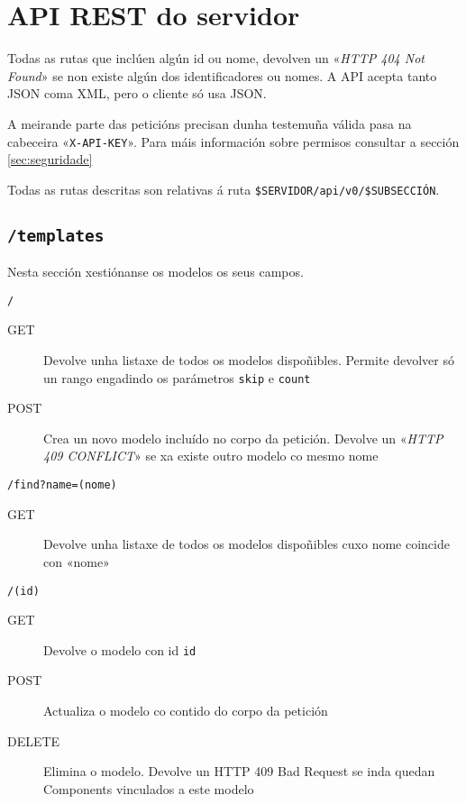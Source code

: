 \section{API REST do servidor}

Todas as rutas que inclúen algún id ou nome, devolven un «\textit{HTTP 404 Not Found}» se non existe algún dos identificadores ou nomes. A API acepta tanto JSON coma XML, pero o cliente só usa JSON.

A meirande parte das peticións precisan dunha testemuña válida pasa na cabeceira «\texttt{X-API-KEY}». Para máis información sobre permisos consultar a sección 
\ref{sec:seguridade}

Todas as rutas descritas son relativas á ruta \texttt{\$SERVIDOR/api/v0/\$SUBSECCIÓN}.

\newpage

\subsection{\texttt{/templates}}

Nesta sección xestiónanse os modelos os seus campos.

\texttt{/}

\begin{description}
    \item[GET] Devolve unha listaxe de todos os modelos dispoñibles. Permite devolver só un rango engadindo os parámetros \texttt{skip} e \texttt{count}
    \item[POST] Crea un novo modelo incluído no corpo da petición. Devolve un «\textit{HTTP 409 CONFLICT}» se xa existe outro modelo co mesmo nome
\end{description}

\texttt{/find?name=(nome)}

\begin{description}
    \item[GET] Devolve unha listaxe de todos os modelos dispoñibles cuxo nome coincide con «nome»
\end{description}

\texttt{/(id)}

\begin{description}
    \item[GET] Devolve o modelo con id \texttt{id}
    \item[POST] Actualiza o modelo co contido do corpo da petición
    \item[DELETE] Elimina o modelo. Devolve un HTTP 409 Bad Request se inda quedan \Gls{Component}s vinculados a este modelo
\end{description}

